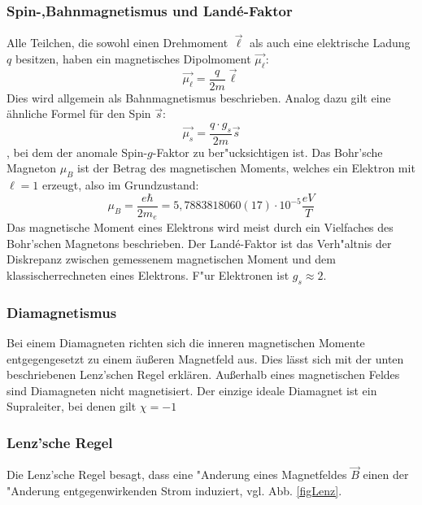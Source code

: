         \subsubsection*{Spin-,Bahnmagnetismus und Land\'e-Faktor}
            Alle Teilchen, die sowohl einen Drehmoment $\vec{\ell}$ als auch eine elektrische Ladung $q$ besitzen, haben ein magnetisches Dipolmoment $\vec{\mu_{\ell}}$:
            \begin{equation}
                \vec{\mu_{\ell}} = \frac{q}{2m} \vec{\ell}
            \end{equation}
            Dies wird allgemein als Bahnmagnetismus beschrieben. Analog dazu gilt eine ähnliche Formel für den Spin $\vec{s}$:
            \begin{equation}
                \vec{\mu_s} = \frac{q\cdot g_s}{2m} \vec{s}
            \end{equation},
            bei dem der anomale Spin-$g$-Faktor zu ber"ucksichtigen ist.
            Das Bohr'sche Magneton $\mu_B$ ist der Betrag des magnetischen Moments, welches ein Elektron
            mit $\ell=1$ erzeugt, also im Grundzustand:
            \begin{equation}
                \mu_B = \frac{e \hbar}{2 m_e} = 5,7883818060(17)\cdot 10^{-5} \frac{eV}{T}
            \end{equation}
            Das magnetische Moment eines Elektrons wird meist durch ein Vielfaches des Bohr'schen
            Magnetons beschrieben.
            Der Land\'e-Faktor ist das Verh"altnis der Diskrepanz zwischen gemessenem magnetischen Moment
            und dem \dq klassisch\dq errechneten eines Elektrons. F"ur Elektronen ist $g_s \approx 2$.
        \subsubsection*{Diamagnetismus}
            Bei einem Diamagneten richten sich die inneren magnetischen Momente entgegengesetzt
            zu einem äußeren Magnetfeld aus. Dies lässt sich mit der unten beschriebenen Lenz'schen Regel erklären.
            Außerhalb eines magnetischen Feldes sind Diamagneten
            nicht magnetisiert. Der einzige ideale Diamagnet ist ein Supraleiter, bei denen gilt $\chi = -1$
        \subsubsection*{Lenz'sche Regel}
            Die Lenz'sche Regel besagt, dass eine "Anderung eines Magnetfeldes $\vec{B}$ einen der "Anderung
            entgegenwirkenden Strom induziert, vgl. Abb. \ref{figLenz}.

